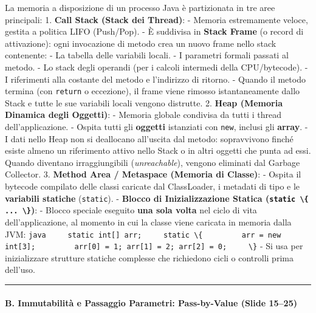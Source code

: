 \documentclass[11pt,a4paper]{article}
\newcommand{\passthrough}[1]{#1}
\begin{document}
La memoria a disposizione di un processo Java è partizionata in tre aree
principali: 1. \textbf{Call Stack (Stack dei Thread)}: - Memoria
estremamente veloce, gestita a politica LIFO (Push/Pop). - È suddivisa
in \textbf{Stack Frame} (o record di attivazione): ogni invocazione di
metodo crea un nuovo frame nello stack contenente: - La tabella delle
variabili locali. - I parametri formali passati al metodo. - Lo stack
degli operandi (per i calcoli intermedi della CPU/bytecode). - I
riferimenti alla costante del metodo e l'indirizzo di ritorno. - Quando
il metodo termina (con \passthrough{\lstinline!return!} o eccezione), il
frame viene rimosso istantaneamente dallo Stack e tutte le sue variabili
locali vengono distrutte. 2. \textbf{Heap (Memoria Dinamica degli
Oggetti)}: - Memoria globale condivisa da tutti i thread
dell'applicazione. - Ospita tutti gli \textbf{oggetti} istanziati con
\passthrough{\lstinline!new!}, inclusi gli \textbf{array}. - I dati
nello Heap non si deallocano all'uscita dal metodo: sopravvivono finché
esiste almeno un riferimento attivo nello Stack o in altri oggetti che
punta ad essi. Quando diventano irraggiungibili (\emph{unreachable}),
vengono eliminati dal Garbage Collector. 3. \textbf{Method Area /
Metaspace (Memoria di Classe)}: - Ospita il bytecode compilato delle
classi caricate dal ClassLoader, i metadati di tipo e le
\textbf{variabili statiche} (\passthrough{\lstinline!static!}). -
\textbf{Blocco di Inizializzazione Statica
(\passthrough{\lstinline!static \{ ... \}!})}: - Blocco speciale
eseguito \textbf{una sola volta} nel ciclo di vita dell'applicazione, al
momento in cui la classe viene caricata in memoria dalla JVM:
\passthrough{\lstinline!java     static int[] arr;     static \{         arr = new int[3];         arr[0] = 1; arr[1] = 2; arr[2] = 0;     \}!}
- Si usa per inizializzare strutture statiche complesse che richiedono
cicli o controlli prima dell'uso.

\begin{center}\rule{0.5\linewidth}{0.5pt}\end{center}

\paragraph{B. Immutabilità e Passaggio Parametri: Pass-by-Value (Slide
15--25)}\label{b.-immutabilituxe0-e-passaggio-parametri-pass-by-value-slide-1525}
\end{document}
